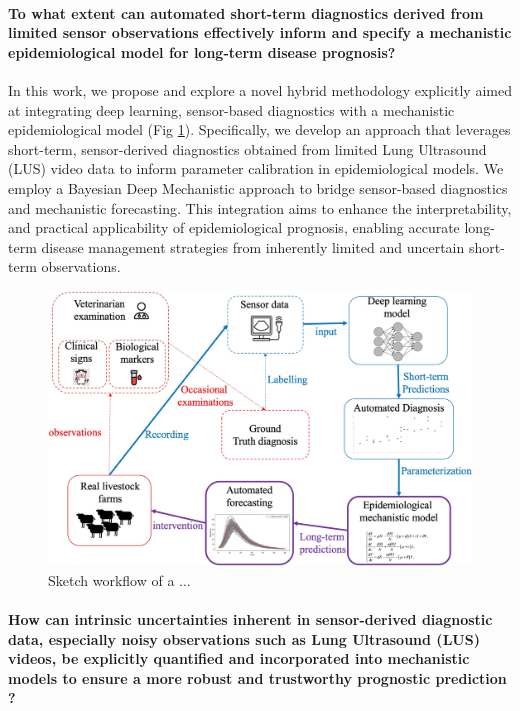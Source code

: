 \paragraph{To what extent can automated short-term diagnostics derived from limited sensor observations effectively inform and specify a mechanistic epidemiological model for long-term disease prognosis?} In this work, we propose and explore a novel hybrid methodology explicitly aimed at integrating deep learning, sensor-based diagnostics with a mechanistic epidemiological model (Fig \ref{fig:chap4-question1}). Specifically, we develop an approach that leverages short-term, sensor-derived diagnostics obtained from limited Lung Ultrasound (LUS) video data to inform parameter calibration in epidemiological models. We employ a Bayesian Deep Mechanistic approach to bridge sensor-based diagnostics and mechanistic forecasting. This integration aims to enhance the interpretability, and practical applicability of epidemiological prognosis, enabling accurate long-term disease management strategies from inherently limited and uncertain short-term observations. 


\begin{figure}[H]
  \includegraphics[width=\linewidth]{figures/chap4/chap4-question1.jpg}
  \caption{Sketch workflow of a ...}
  \label{fig:chap4-question1}
\end{figure}

\paragraph{How can intrinsic uncertainties inherent in sensor-derived diagnostic data, especially noisy observations such as Lung Ultrasound (LUS) videos, be explicitly quantified and incorporated into mechanistic models to ensure a more robust and trustworthy prognostic prediction ?}

